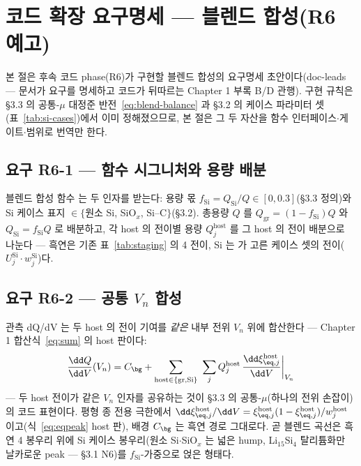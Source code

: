 \section{코드 확장 요구명세 --- 블렌드 합성(R6 예고)}\label{sec:si-code}
본 절은 후속 코드 phase(R6)가 구현할 블렌드 합성의 요구명세 초안이다(doc-leads --- 문서가 요구를
명세하고 코드가 뒤따르는 Chapter 1 부록 B/D 관행). 구현 규칙은 §3.3 의 공통-$\mu$ 대정준
반전~\eqref{eq:blend-balance} 과 §3.2 의 케이스 파라미터 셋(표~\ref{tab:si-cases})에서 이미 정해졌으므로,
본 절은 그 두 자산을 함수 인터페이스$\cdot$게이트$\cdot$범위로 번역만 한다.

\subsection{요구 R6-1 --- 함수 시그니처와 용량 배분}\label{ssec:si-code-sig}
블렌드 합성 함수  는 두 인자를 받는다: 용량 몫
$f_\mathrm{Si}=Q_\mathrm{Si}/Q\in[0,0.3]$(§3.3 정의)와 Si 케이스 표지 $\in\{$원소
Si, SiO$_x$, Si--C$\}$(§3.2). 총용량 $Q$ 를 $Q_\mathrm{gr}=(1-f_\mathrm{Si})Q$ 와
$Q_\mathrm{Si}=f_\mathrm{Si}Q$ 로 배분하고, 각 host 의 전이별 용량 $Q_j^\mathrm{host}$ 를 그 host 의
전이 배분으로 나눈다 --- 흑연은 기존 표~\ref{tab:staging} 의 4 전이, Si 는  가 고른
케이스 셋의 전이($U_j^\mathrm{Si}\cdot w_j^\mathrm{Si}$)다.

\subsection{요구 R6-2 --- 공통 $V_n$ 합성}\label{ssec:si-code-synth}
관측 dQ/dV 는 두 host 의 전이 기여를 \emph{같은} 내부 전위 $V_n$ 위에 합산한다 --- Chapter 1
합산식~\eqref{eq:sum} 의 host 판이다:
\begin{equation}
\frac{\dd Q}{\dd V}(V_n)=C_\bg+\sum_{\mathrm{host}\in\{\mathrm{gr},\mathrm{Si}\}}\ \sum_{j}
Q_j^\mathrm{host}\,\frac{\dd\xi_{\eq,j}^\mathrm{host}}{\dd V}\bigg|_{V_n}
\label{eq:si-code-sum}
\end{equation}
--- 두 host 전이가 같은 $V_n$ 인자를 공유하는 것이 §3.3 의 공통-$\mu$(하나의 전위 손잡이)의 코드
표현이다. 평형 종 전용 극한에서 $\dd\xi_{\eq,j}^\mathrm{host}/\dd V=\xi_{\eq,j}^\mathrm{host}
(1-\xi_{\eq,j}^\mathrm{host})/w_j^\mathrm{host}$ 이고(식~\eqref{eq:eqpeak} host 판), 배경 $C_\bg$ 는 흑연
경로 그대로다. 곧 블렌드 곡선은 흑연 4 봉우리 위에 Si 케이스 봉우리(원소 Si$\cdot$SiO$_x$ 는 넓은
hump, Li$_{15}$Si$_4$ 탈리튬화만 날카로운 peak --- §3.1 N6)를 $f_\mathrm{Si}$-가중으로 얹은 형태다.

